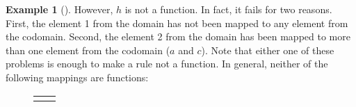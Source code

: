 \documentclass[10pt,]{book}
\theoremstyle{plain}
\theoremstyle{definition}
\newtheorem{example}[theorem]{Example}
\theoremstyle{definition}
\theoremstyle{definition}
\numberwithin{equation}{chapter}
\newlength{\panelmax}
\begin{document}
\begin{example}[]
          However, \(h\) is not a function. In fact, it fails for two reasons. First, the element 1 from the domain has not been mapped to any element from the codomain. Second, the element 2 from the domain has been mapped to more than one element from the codomain (\(a\) and \(c\)). Note that either one of these problems is enough to make a rule not a function. In general, neither of the following mappings are functions:
{%
\setlength{\panelmax}{0pt}
\newsavebox{\panelboxSimage}
\newlength{\phSimage}\setlength{\phSimage}{\ht\panelboxSimage+\dp\panelboxSimage}
\settototalheight{\phSimage}{\usebox{\panelboxSimage}}
\setlength{\panelmax}{\maxof{\panelmax}{\phSimage}}
\newsavebox{\panelboxTimage}
\newlength{\phTimage}\setlength{\phTimage}{\ht\panelboxTimage+\dp\panelboxTimage}
\settototalheight{\phTimage}{\usebox{\panelboxTimage}}
\setlength{\panelmax}{\maxof{\panelmax}{\phTimage}}
\leavevmode%
\setlength{\tabcolsep}{0.1375\textwidth}
\begin{figure}
\hspace*{0.1375\textwidth}%
\begin{tabular}{@{}*{2}{c}@{}}
\begin{minipage}[c][\panelmax][t]{0.18\textwidth}\usebox{\panelboxSimage}\end{minipage}&
\begin{minipage}[c][\panelmax][t]{0.27\textwidth}\usebox{\panelboxTimage}\end{minipage}\end{tabular}
\end{figure}
}%
\par


\end{example}
\end{document}
